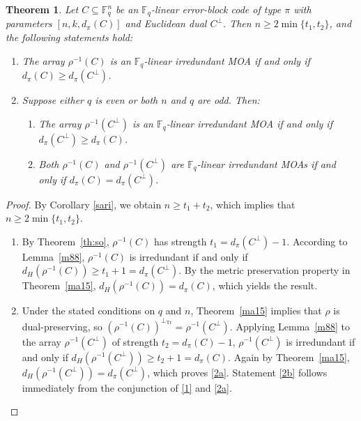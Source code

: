 \documentclass[11pt]{article}
\newtheorem{Theorem}{Theorem}[section]
\newtheorem{Definition and Notation}[Theorem]{Definition and Notation}
\begin{document}
\begin{Theorem}\label{latest}
Let $C \subseteq \mathbb{F}_q^n$ be an $\mathbb{F}_q$-linear error-block code of type $\pi$ with parameters $[n, k, d_{\pi}(C)]$ and Euclidean dual $C^\perp$. Then $n \ge 2\min\{t_1, t_2\}$, and the following statements hold:
\begin{enumerate}
    \item \label{1} The array $\rho^{-1}(C)$ is an $\mathbb{F}_q$-linear irredundant MOA if and only if $d_\pi(C) \ge d_\pi(C^{\perp})$.
    \item Suppose either $q$ is even or both $n$ and $q$ are odd. Then:
    \begin{enumerate}
        \item \label{2a} The  array $\rho^{-1}(C^\perp)$ is an $\mathbb{F}_q$-linear irredundant MOA if and only if $d_\pi(C^{\perp}) \ge d_\pi(C)$.
        \item \label{2b} Both $\rho^{-1}(C)$ and $\rho^{-1}(C^\perp)$ are $\mathbb{F}_q$-linear irredundant MOAs if and only if $d_\pi(C) = d_\pi(C^{\perp})$.
    \end{enumerate}
\end{enumerate}
\end{Theorem}

\begin{proof}
By Corollary \ref{sari}, we obtain $n \ge t_1+t_2$, which implies that $n \ge 2\min\{t_1, t_2\}$.
\begin{enumerate}
    \item  By Theorem~\ref{th:so}, $\rho^{-1}(C)$ has strength $t_1 = d_\pi(C^{\perp})-1$. According to Lemma~\ref{m88}, $\rho^{-1}(C)$ is irredundant if and only if $d_H(\rho^{-1}(C)) \ge t_1 + 1 = d_\pi(C^{\perp})$. By the metric preservation property in Theorem~\ref{ma15}, $d_H(\rho^{-1}(C)) = d_\pi(C)$, which yields the result.
    \item  Under the stated conditions on $q$ and $n$, Theorem~\ref{ma15} implies that $\rho$ is dual-preserving, so $(\rho^{-1}(C))^{\perp_{\mathrm{Tr}}} = \rho^{-1}(C^\perp)$. Applying Lemma~\ref{m88} to the array $\rho^{-1}(C^\perp)$ of  strength $t_2 = d_\pi(C)-1$, $\rho^{-1}(C^\perp)$ is irredundant if and only if $d_H(\rho^{-1}(C^\perp)) \ge t_2 + 1 = d_\pi(C)$. Again by Theorem~\ref{ma15}, $d_H(\rho^{-1}(C^\perp)) = d_\pi(C^\perp)$, which proves \ref{2a}. Statement \ref{2b} follows immediately from the conjunction of \ref{1} and \ref{2a}.
\end{enumerate}
\end{proof}
\end{document}
